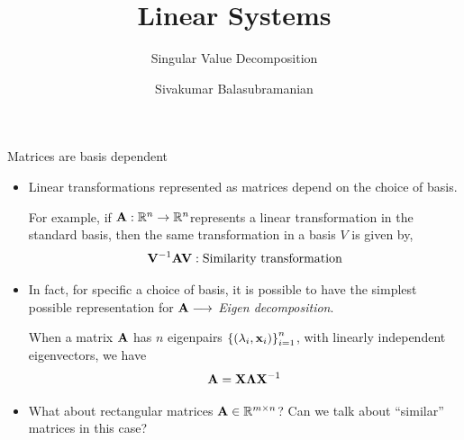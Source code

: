 \documentclass[aspectratio=169]{beamer}
\title{Linear Systems}
\subtitle{Singular Value Decomposition}
\author{Sivakumar Balasubramanian}
\institute[Christian Medical College] %
{
  \inst{}%
  Department of Bioengineering\\
  Christian Medical College, Bagayam\\
  Vellore 632002
}
\date{}
\def\mf{\ensuremath\mathbf}
\def\mb{\ensuremath\mathbb}
\def\lp{\ensuremath\left(}
\def\rp{\ensuremath\right)}
\def\lc{\ensuremath\left\{}
\def\rc{\ensuremath\right\}}
\begin{document}


\begin{frame}
  \titlepage
\end{frame}



\begin{frame}[t]{Matrices are basis dependent}
\begin{itemize}
    \item Linear transformations represented as matrices depend on the choice of basis.

    For example, if $\mf{A}: \mb{R}^n \to \mb{R}^n$represents a linear transformation in the standard basis, then the same transformation in a basis $V$ is given by,
    \[ \mf{V}^{-1}\mf{A}\mf{V}: \text{Similarity transformation} \]

    \item In fact, for specific a choice of basis, it is possible to have the simplest possible representation for $\mf{A} \longrightarrow$ \textit{Eigen decomposition}.

    When a matrix $\mf{A}$ has $n$ eigenpairs $\lc\lp\lambda_i, \mf{x}_i\rp\rc_{i=1}^{n}$, with linearly independent eigenvectors, we have
    \[ \mf{A} = \mf{X}\mf{\Lambda}\mf{X}^{-1} \]

    \item What about rectangular matrices $\mf{A} \in \mb{R}^{m \times n}$? Can we talk about ``similar'' matrices in this case?
\end{itemize}
\end{frame}
\end{document}
